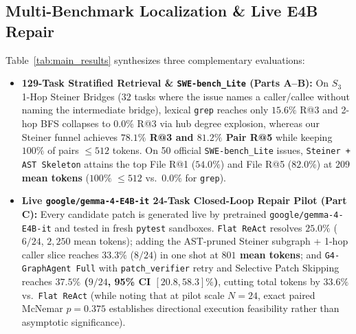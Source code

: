\documentclass[10pt,twocolumn,letterpaper]{article}
\begin{document}
\subsection{Multi-Benchmark Localization \& Live E4B Repair}
Table~\ref{tab:main_results} synthesizes three complementary evaluations:
\begin{itemize}
    \item \textbf{129-Task Stratified Retrieval \& \texttt{SWE-bench\_Lite} (Parts A--B):} On $S_3$ 1-Hop Steiner Bridges ($32$ tasks where the issue names a caller/callee without naming the intermediate bridge), lexical \texttt{grep} reaches only $15.6\%$ R@3 and 2-hop BFS collapses to $0.0\%$ R@3 via hub degree explosion, whereas our Steiner funnel achieves \textbf{$78.1\%$ R@3 and $81.2\%$ Pair R@5} while keeping $100\%$ of pairs $\le 512$ tokens. On 50 official \texttt{SWE-bench\_Lite} issues, \texttt{Steiner + AST Skeleton} attains the top File R@1 (\textbf{$54.0\%$}) and File R@5 (\textbf{$82.0\%$}) at \textbf{$209$ mean tokens} ($100\%$ $\le 512$ vs.\ $0.0\%$ for \texttt{grep}).
    \item \textbf{Live \texttt{google/gemma-4-E4B-it} 24-Task Closed-Loop Repair Pilot (Part C):} Every candidate patch is generated live by pretrained \texttt{google/gemma-4-E4B-it} and tested in fresh \texttt{pytest} sandboxes. \texttt{Flat ReAct} resolves $25.0\%$ ($6/24$, $2,250$ mean tokens); adding the AST-pruned Steiner subgraph + 1-hop caller slice reaches $33.3\%$ ($8/24$) in one shot at \textbf{$801$ mean tokens}; and \texttt{G4-GraphAgent Full} with \texttt{patch\_verifier} retry and Selective Patch Skipping reaches \textbf{$37.5\%$ ($9/24$, 95\% CI $[20.8,58.3]\%$)}, cutting total tokens by $33.6\%$ vs.\ \texttt{Flat ReAct} (while noting that at pilot scale $N{=}24$, exact paired McNemar $p{=}0.375$ establishes directional execution feasibility rather than asymptotic significance).
\end{itemize}
\end{document}
